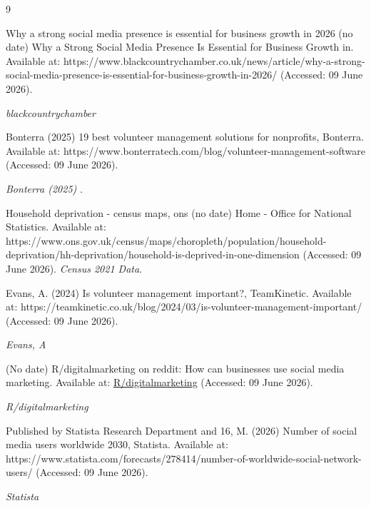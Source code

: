 \documentclass[11pt,a4paper]{article}
\begin{document}
\begin{thebibliography}{9}


Why a strong social media presence is essential for business growth in 2026 (no date) Why a Strong Social Media Presence Is Essential for Business Growth in. Available at: https://www.blackcountrychamber.co.uk/news/article/why-a-strong-social-media-presence-is-essential-for-business-growth-in-2026/ (Accessed: 09 June 2026). 

\textit{blackcountrychamber}


Bonterra (2025) 19 best volunteer management solutions for nonprofits, Bonterra. Available at: https://www.bonterratech.com/blog/volunteer-management-software (Accessed: 09 June 2026). 

\textit{Bonterra (2025) }.

Household deprivation - census maps, ons (no date) Home - Office for National Statistics. Available at: https://www.ons.gov.uk/census/maps/choropleth/population/household-deprivation/hh-deprivation/household-is-deprived-in-one-dimension (Accessed: 09 June 2026). 
\textit{Census 2021 Data}.


Evans, A. (2024) Is volunteer management important?, TeamKinetic. Available at: https://teamkinetic.co.uk/blog/2024/03/is-volunteer-management-important/ (Accessed: 09 June 2026). 

\textit{Evans, A }


(No date) R/digitalmarketing on reddit: How can businesses use social media marketing. Available at: \href{https://www.reddit.com/r/DigitalMarketing/comments/t8vhqt/how_can_businesses_use_social_media_marketing/}{R/digitalmarketing} (Accessed: 09 June 2026). 

\textit{R/digitalmarketing }


Published by  Statista Research Department and 16, M. (2026) Number of social media users worldwide 2030, Statista. Available at: https://www.statista.com/forecasts/278414/number-of-worldwide-social-network-users/ (Accessed: 09 June 2026). 

\textit{Statista}




\end{thebibliography}
\end{document}
